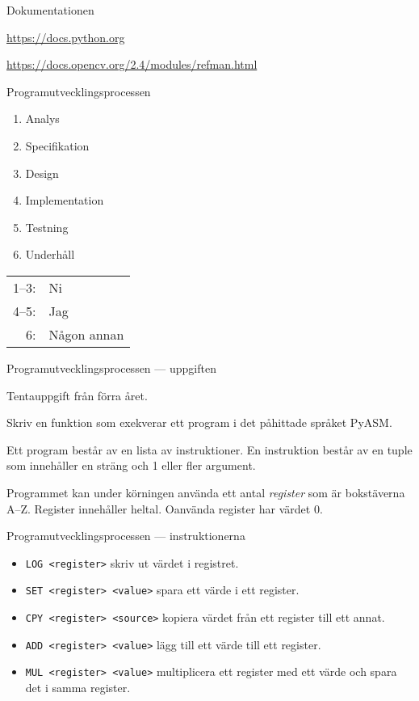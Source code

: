 \documentclass{beamer}
\begin{document}
  \begin{frame}{Dokumentationen}

    \url{https://docs.python.org}

    \url{https://docs.opencv.org/2.4/modules/refman.html}

  \end{frame}

  \begin{frame}{Programutvecklingsprocessen}

    \begin{enumerate}
      \item Analys
      \item Specifikation
      \item Design
      \item Implementation
      \item Testning
      \item Underhåll
    \end{enumerate}

    \pause{}

    \begin{tabular}{r l}
      1--3: & Ni \\
      4--5: & Jag \\
      6: & Någon annan
    \end{tabular}

  \end{frame}

  \begin{frame}{Programutvecklingsprocessen --- uppgiften}

    Tentauppgift från förra året.

    \pause{}

    Skriv en funktion som exekverar ett program i det påhittade språket PyASM.

    Ett program består av en lista av instruktioner. En instruktion består av en
    tuple som innehåller en sträng och 1 eller fler argument.

    Programmet kan under körningen använda ett antal \emph{register} som är
    bokstäverna A--Z. Register innehåller heltal. Oanvända register har värdet
    0.

  \end{frame}

  \begin{frame}{Programutvecklingsprocessen --- instruktionerna}

    \begin{itemize}
      \item \texttt{LOG <register>} skriv ut värdet i registret.
      \item \texttt{SET <register> <value>} spara ett värde i ett register.
      \item \texttt{CPY <register> <source>} kopiera värdet från ett register till ett annat.
      \item \texttt{ADD <register> <value>} lägg till ett värde till ett register.
      \item \texttt{MUL <register> <value>} multiplicera ett register med ett värde och spara det i samma register.
    \end{itemize}

  \end{frame}
\end{document}
